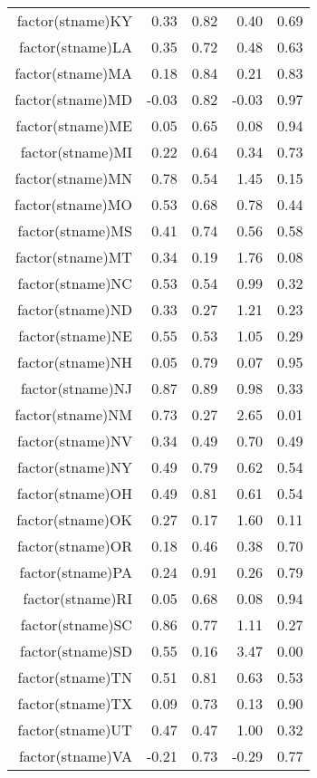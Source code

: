 \begin{table}[ht]
\begin{tabular}{rrrrr}
  factor(stname)KY & 0.33 & 0.82 & 0.40 & 0.69 \\ 
  factor(stname)LA & 0.35 & 0.72 & 0.48 & 0.63 \\ 
  factor(stname)MA & 0.18 & 0.84 & 0.21 & 0.83 \\ 
  factor(stname)MD & -0.03 & 0.82 & -0.03 & 0.97 \\ 
  factor(stname)ME & 0.05 & 0.65 & 0.08 & 0.94 \\ 
  factor(stname)MI & 0.22 & 0.64 & 0.34 & 0.73 \\ 
  factor(stname)MN & 0.78 & 0.54 & 1.45 & 0.15 \\ 
  factor(stname)MO & 0.53 & 0.68 & 0.78 & 0.44 \\ 
  factor(stname)MS & 0.41 & 0.74 & 0.56 & 0.58 \\ 
  factor(stname)MT & 0.34 & 0.19 & 1.76 & 0.08 \\ 
  factor(stname)NC & 0.53 & 0.54 & 0.99 & 0.32 \\ 
  factor(stname)ND & 0.33 & 0.27 & 1.21 & 0.23 \\ 
  factor(stname)NE & 0.55 & 0.53 & 1.05 & 0.29 \\ 
  factor(stname)NH & 0.05 & 0.79 & 0.07 & 0.95 \\ 
  factor(stname)NJ & 0.87 & 0.89 & 0.98 & 0.33 \\ 
  factor(stname)NM & 0.73 & 0.27 & 2.65 & 0.01 \\ 
  factor(stname)NV & 0.34 & 0.49 & 0.70 & 0.49 \\ 
  factor(stname)NY & 0.49 & 0.79 & 0.62 & 0.54 \\ 
  factor(stname)OH & 0.49 & 0.81 & 0.61 & 0.54 \\ 
  factor(stname)OK & 0.27 & 0.17 & 1.60 & 0.11 \\ 
  factor(stname)OR & 0.18 & 0.46 & 0.38 & 0.70 \\ 
  factor(stname)PA & 0.24 & 0.91 & 0.26 & 0.79 \\ 
  factor(stname)RI & 0.05 & 0.68 & 0.08 & 0.94 \\ 
  factor(stname)SC & 0.86 & 0.77 & 1.11 & 0.27 \\ 
  factor(stname)SD & 0.55 & 0.16 & 3.47 & 0.00 \\ 
  factor(stname)TN & 0.51 & 0.81 & 0.63 & 0.53 \\ 
  factor(stname)TX & 0.09 & 0.73 & 0.13 & 0.90 \\ 
  factor(stname)UT & 0.47 & 0.47 & 1.00 & 0.32 \\ 
  factor(stname)VA & -0.21 & 0.73 & -0.29 & 0.77 \\ 

\end{tabular}
\end{table}
